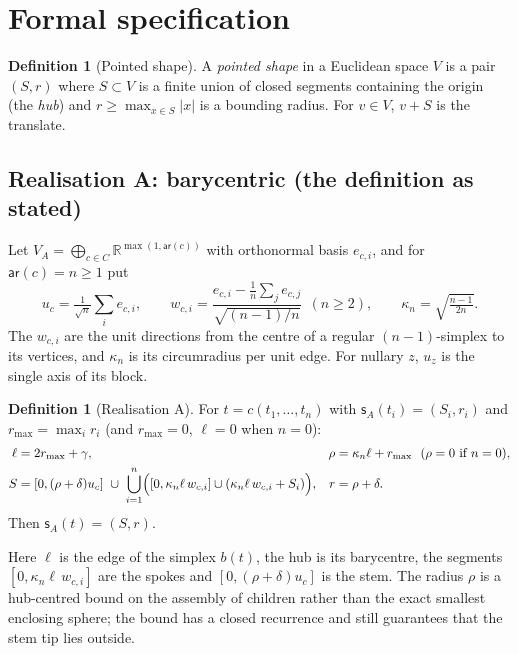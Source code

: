 \documentclass[11pt]{article}
\theoremstyle{definition}
\newtheorem{definition}[theorem]{Definition}
\theoremstyle{remark}
\newcommand{\R}{\mathbb{R}}
\newcommand{\ar}{\mathsf{ar}}
\newcommand{\sh}{\mathsf{s}}
\newcommand{\rad}{r}
\begin{document}
\section{Formal specification}\label{sec:spec}

\begin{definition}[Pointed shape]
A \emph{pointed shape} in a Euclidean space $V$ is a pair $(S,\rad)$ where
$S\subset V$ is a finite union of closed segments containing the origin (the
\emph{hub}) and $\rad\ge\max_{x\in S}|x|$ is a bounding radius. For $v\in V$,
$v+S$ is the translate.
\end{definition}

\subsection{Realisation A: barycentric (the definition as stated)}

Let $V_A=\bigoplus_{c\in C}\R^{\max(1,\ar(c))}$ with orthonormal basis
$e_{c,i}$, and for $\ar(c)=n\ge1$ put
\[
u_c=\tfrac{1}{\sqrt n}\textstyle\sum_{i}e_{c,i},\qquad
w_{c,i}=\frac{e_{c,i}-\frac1n\sum_j e_{c,j}}{\sqrt{(n-1)/n}}\ \ (n\ge2),\qquad
\kappa_n=\sqrt{\tfrac{n-1}{2n}} .
\]
The $w_{c,i}$ are the unit directions from the centre of a regular
$(n-1)$-simplex to its vertices, and $\kappa_n$ is its circumradius per unit edge.
For nullary $z$, $u_z$ is the single axis of its block.

\begin{definition}[Realisation A]\label{def:A}
For $t=c(t_1,\dots,t_n)$ with $\sh_A(t_i)=(S_i,\rad_i)$ and
$\rad_{\max}=\max_i\rad_i$ (and $\rad_{\max}=0$, $\ell=0$ when $n=0$):
\begin{align*}
\ell &= 2\rad_{\max}+\gamma, &
\rho &= \kappa_n\ell+\rad_{\max}\ \ (\rho=0 \text{ if } n=0),\\
S &= [0,(\rho+\delta)u_c]\ \cup\ \bigcup_{i=1}^n\Bigl([0,\kappa_n\ell\,w_{c,i}]\cup(\kappa_n\ell\,w_{c,i}+S_i)\Bigr), &
\rad &= \rho+\delta .
\end{align*}
Then $\sh_A(t)=(S,\rad)$.
\end{definition}

Here $\ell$ is the edge of the simplex $b(t)$, the hub is its barycentre, the
segments $[0,\kappa_n\ell\,w_{c,i}]$ are the spokes and $[0,(\rho+\delta)u_c]$ is
the stem. The radius $\rho$ is a hub-centred bound on the assembly of children
rather than the exact smallest enclosing sphere; the bound has a closed recurrence
and still guarantees that the stem tip lies outside.
\end{document}
